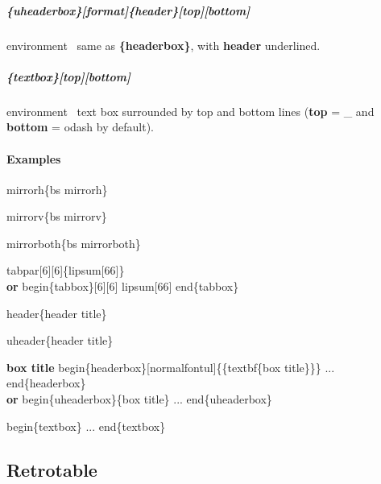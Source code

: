 \documentclass[english,12pt,openany,letterpaper]{book}
\begin{document}
\subparagraph{\{uheaderbox\}[format]\{header\}[top][bottom]} environment \dash\ same as \textbf{\{headerbox\}}, with \textbf{header} underlined.

\skipline

\subparagraph{\{textbox\}[top][bottom]} environment \dash\ text box surrounded by top and bottom lines (\textbf{top} = \bs\_ and \textbf{bottom} = \bs odash by default).

\break

\paragraph{Examples}


 \tab \bs mirrorh\{\bs bs mirrorh\}

 \tab \bs mirrorv\{\bs bs mirrorv\}

 \bs mirrorboth\{\bs bs mirrorboth\}

\skipline

\bs tabpar[6][6]\{\bs lipsum[66]\}
\\\textbf{or} \bs begin\{tabbox\}[6][6] \bs lipsum[66] \bs end\{tabbox\}

\tabpar[6][6]{\lipsum[66]}

\skipline


\bs header\{header title\}

\skipline


\bs uheader\{header title\}

\skipline

\begin{uheaderbox}{\textbf{box title}}
	\bs begin\{headerbox\}[\bs normalfont\bs ul]\{\{\bs textbf\{box title\}\}\} ... \bs end\{headerbox\}
	\\\textbf{or}
	\bs begin\{uheaderbox\}\{box title\} ... \bs end\{uheaderbox\}
\end{uheaderbox}

\begin{textbox}
	\bs begin\{textbox\} ... \bs end\{textbox\}
\end{textbox}

\break


\subsection{Retrotable}
\end{document}

